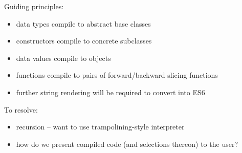 
Guiding principles:
\begin{itemize}
   \item data types compile to abstract base classes
   \item constructors compile to concrete subclasses
   \item data values compile to objects
   \item functions compile to pairs of forward/backward slicing functions
   \item further string rendering will be required to convert \JSCore into ES6
\end{itemize}

\noindent To resolve:
\begin{itemize}
   \item recursion -- want to use trampolining-style interpreter
   \item how do we present compiled code (and selections thereon) to the user?
\end{itemize}



